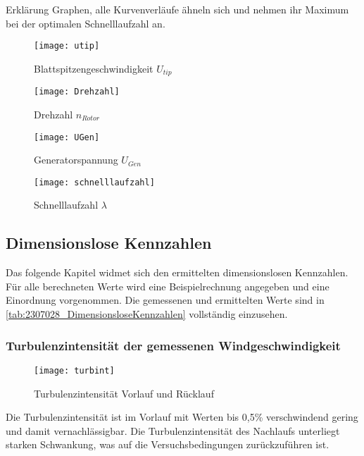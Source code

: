 Erklärung Graphen, alle Kurvenverläufe ähneln sich und nehmen ihr Maximum bei der optimalen Schnelllaufzahl an.
\begin{figure}[H]
    \centering
        \begin{minipage}[t]{0.4\textwidth}
            \texttt{[image: utip]}
            \caption{Blattspitzengeschwindigkeit $U_{tip}$}
            \label{fig:utip}
        \end{minipage}
        \begin{minipage}[t]{0.4\textwidth}
            \texttt{[image: Drehzahl]}
            \caption{Drehzahl $n_{Rotor}$}
            \label{fig:n_rotor}
        \end{minipage}
        \begin{minipage}[b]{0.4\textwidth}
            \texttt{[image: UGen]}
            \caption{Generatorspannung $U_{Gen}$}
            \label{fig:UGen}
        \end{minipage}
        \begin{minipage}[b]{0.4\textwidth}
            \texttt{[image: schnelllaufzahl]}
            \caption{Schnelllaufzahl $\lambda$}
            \label{fig:lambda}
        \end{minipage}
    \end{figure}  

\subsection{Dimensionslose Kennzahlen}
Das folgende Kapitel widmet sich den ermittelten dimensionslosen Kennzahlen.
Für alle berechneten Werte wird eine Beispielrechnung angegeben und eine Einordnung vorgenommen.
Die gemessenen und ermittelten Werte sind in \autoref{tab:2307028_DimensionsloseKennzahlen} vollständig einzusehen.
\subsubsection*{Turbulenzintensität der gemessenen Windgeschwindigkeit}
\begin{figure}[H]
    \centering
    \texttt{[image: turbint]}
    \caption{Turbulenzintensität Vorlauf und Rücklauf}
    \label{fig:Turbulenzintensität}
\end{figure}
Die Turbulenzintensität ist im Vorlauf mit Werten bis 0,5\% verschwindend gering und damit vernachlässigbar. Die Turbulenzintensität des Nachlaufs unterliegt starken Schwankung, was auf die Versuchsbedingungen zurückzuführen ist.

